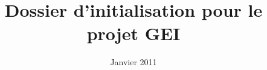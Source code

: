 \documentclass[a4paper]{report}
\title{Dossier d'initialisation pour le projet GEI}
\date{Janvier 2011}
\begin{document}
\maketitle

\vfill
\pagebreak

\tableofcontents

\vfill
\pagebreak

\end{document}
